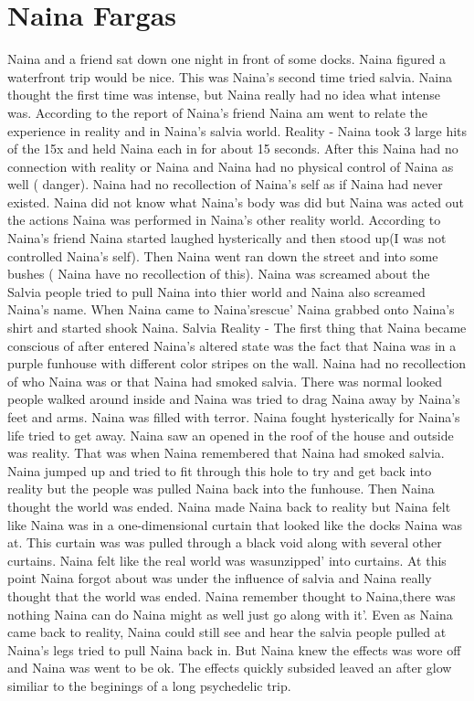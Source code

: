 \documentclass[12pt]{book}
\begin{document}
\chapter{Naina Fargas}

Naina and a friend sat down one night in front of some docks. Naina figured a waterfront trip would be nice. This was Naina's second time tried salvia. Naina thought the first time was intense, but Naina really had no idea what intense was. According to the report of Naina's friend Naina am went to relate the experience in reality and in Naina's salvia world. Reality - Naina took 3 large hits of the 15x and held Naina each in for about 15 seconds. After this Naina had no connection with reality or Naina and Naina had no physical control of Naina as well ( danger). Naina had no recollection of Naina's self as if Naina had never existed. Naina did not know what Naina's body was did but Naina was acted out the actions Naina was performed in Naina's other reality world. According to Naina's friend Naina started laughed hysterically and then stood up(I was not controlled Naina's self). Then Naina went ran down the street and into some bushes ( Naina have no recollection of this). Naina was screamed about the Salvia people tried to pull Naina into thier world and Naina also screamed Naina's name. When Naina came to Naina'srescue' Naina grabbed onto Naina's shirt and started shook Naina. Salvia Reality - The first thing that Naina became conscious of after entered Naina's altered state was the fact that Naina was in a purple funhouse with different color stripes on the wall. Naina had no recollection of who Naina was or that Naina had smoked salvia. There was normal looked people walked around inside and Naina was tried to drag Naina away by Naina's feet and arms. Naina was filled with terror. Naina fought hysterically for Naina's life tried to get away. Naina saw an opened in the roof of the house and outside was reality. That was when Naina remembered that Naina had smoked salvia. Naina jumped up and tried to fit through this hole to try and get back into reality but the people was pulled Naina back into the funhouse. Then Naina thought the world was ended. Naina made Naina back to reality but Naina felt like Naina was in a one-dimensional curtain that looked like the docks Naina was at. This curtain was was pulled through a black void along with several other curtains. Naina felt like the real world was wasunzipped' into curtains. At this point Naina forgot about was under the influence of salvia and Naina really thought that the world was ended. Naina remember thought to Naina,there was nothing Naina can do Naina might as well just go along with it'. Even as Naina came back to reality, Naina could still see and hear the salvia people pulled at Naina's legs tried to pull Naina back in. But Naina knew the effects was wore off and Naina was went to be ok. The effects quickly subsided leaved an after glow similiar to the beginings of a long psychedelic trip.
\end{document}
